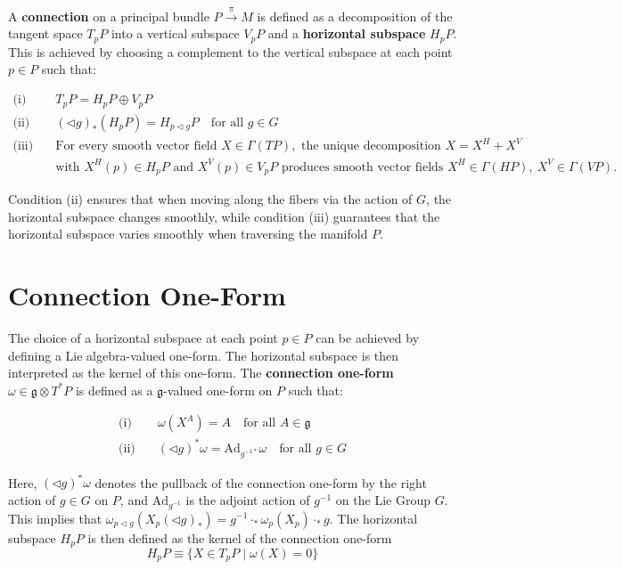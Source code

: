 A \textbf{connection} on a principal bundle \( P \xrightarrow{\pi} M \) is defined as a decomposition of the tangent space \( T_pP \) into a vertical subspace \( V_pP \) and a \textbf{horizontal subspace} \( H_pP \). This is achieved by choosing a complement to the vertical subspace at each point \( p \in P \) such that\cite{DudekEhreshmanntheoryconnectionprincipalbundlecompendiumphysicists2018}:

\begin{align*}
  \text{(i)}\quad 
    & T_pP = H_pP \oplus V_pP \\
  \text{(ii)}\quad 
    & (\triangleleft g)_* (H_pP) = H_{p \triangleleft g}P 
    \quad \text{for all } g \in G \\
  \text{(iii)}\quad 
    & \text{For every smooth vector field } X \in \Gamma(TP), \text{ the unique decomposition } 
      X = X^H + X^V \\
    & \text{with } X^H(p) \in H_pP \text{ and } X^V(p) \in V_pP \text{ produces smooth vector fields } 
      X^H \in \Gamma(HP),\ X^V \in \Gamma(VP).
\end{align*}

Condition (ii) ensures that when moving along the fibers via the action of \( G \), the horizontal subspace changes smoothly, while condition (iii) guarantees that the horizontal subspace varies smoothly when traversing the manifold \( P \).


\section{Connection One-Form}

The choice of a horizontal subspace at each point \( p \in P \) can be achieved by defining a Lie algebra-valued one-form. The horizontal subspace is then interpreted as the kernel of this one-form. The \textbf{connection one-form} \( \omega \in \mathfrak{g} \otimes T^*P \) is defined as a \( \mathfrak{g} \)-valued one-form on \( P \) such that:

\begin{align*}
  \text{(i)}\quad 
    & \omega(X^A) = A \quad \text{for all } A \in \mathfrak{g} \\
  \text{(ii)}\quad 
    & (\triangleleft g)^* \omega = \text{Ad}_{g^{-1*}} \omega \quad \text{for all } g \in G 
\end{align*}

Here, \( (\triangleleft g)^* \omega \) denotes the pullback of the connection one-form by the right action of \( g \in G \) on \( P \), and \( \text{Ad}_{g^{-1}} \) is the adjoint action of \( g^{-1} \) on the Lie Group \( G \). This implies that \( \omega_{p \triangleleft g}(X_p(\triangleleft g)_*) = g^{-1} \cdot_* \omega_p(X_p) \cdot_* g \). The horizontal subspace \( H_pP \) is then defined as the kernel of the connection one-form\cite{NakaharaGeometrytopologyphysics2005}
\[ H_pP \equiv \{ X \in T_pP \mid \omega(X)=0 \} \]

